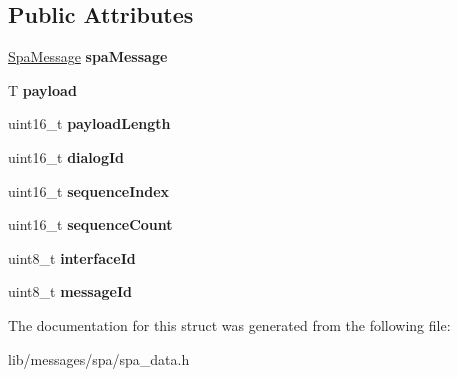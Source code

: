 \subsection*{Public Attributes}
\begin{DoxyCompactItemize}
\item 
\mbox{\label{structSpaData_a92344b63fb9ae2e080c30d4810020170}} 
\hyperlink{structSpaMessage}{Spa\+Message} {\bfseries spa\+Message}
\item 
\mbox{\label{structSpaData_a615546d992c6f12e9ac6f1f2db202be7}} 
T {\bfseries payload}
\item 
\mbox{\label{structSpaData_a9a13479cc5d5fe7d648a4676f558bd5d}} 
uint16\+\_\+t {\bfseries payload\+Length}
\item 
\mbox{\label{structSpaData_ac0b96669c8271ace6706c70008c59981}} 
uint16\+\_\+t {\bfseries dialog\+Id}
\item 
\mbox{\label{structSpaData_af73ab34cf6e29508bc8531a7846e39ef}} 
uint16\+\_\+t {\bfseries sequence\+Index}
\item 
\mbox{\label{structSpaData_a8942336c812cd66dabc7f45fd7d43642}} 
uint16\+\_\+t {\bfseries sequence\+Count}
\item 
\mbox{\label{structSpaData_a4058e924739e721a3a006db80e609576}} 
uint8\+\_\+t {\bfseries interface\+Id}
\item 
\mbox{\label{structSpaData_a3c59b61ef43032b50c40eea6807e074f}} 
uint8\+\_\+t {\bfseries message\+Id}
\end{DoxyCompactItemize}


The documentation for this struct was generated from the following file\+:\begin{DoxyCompactItemize}
\item 
lib/messages/spa/spa\+\_\+data.\+h\end{DoxyCompactItemize}
